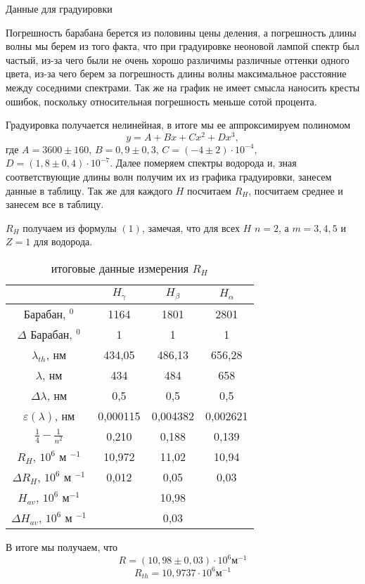 \documentclass[a4paper, 12pt]{article}%
\begin{document}
\begin{table}[h]
\begin{center}
\caption{Данные для градуировки}

\end{center}
\end{table}

Погрешность барабана берется из половины цены деления, а погрешность длины волны мы берем из того факта, что при градуировке неоновой лампой спектр был частый, из-за чего были не очень хорошо различимы различные оттенки одного цвета, из-за чего берем за погрешность длины волны максимальное расстояние между соседними спектрами. Так же на график не имеет смысла наносить кресты ошибок, поскольку относительная погрешность меньше сотой процента.


Градуировка получается нелинейная, в итоге мы ее аппроксимируем полиномом 
\[y = A + Bx + Cx^2 + Dx^3,\]
где $A = 3600\pm160$, $B = 0,9\pm0,3$, $C = (-4\pm2) \cdot 10^{-4}$, $D = (1,8 \pm 0,4) \cdot 10^{-7}$.
\newpage
Далее померяем спектры водорода и, зная соответствующие длины волн получим их из графика градуировки, занесем данные в таблицу. Так же для каждого $H$ посчитаем $R_H$, посчитаем среднее и занесем все в таблицу. 

$R_H$ получаем из формулы $(1)$, замечая, что для всех $H$ $n = 2$, а $m = 3, 4, 5$ и $Z=1$ для водорода.
\begin{table}[h]
\begin{center}
\begin{tabular}{|c|c|c|c|}
\hline
                            & $H_{\gamma}$ & $H_{\beta}$ & $H_{\alpha}$ \\ \hline
Барабан, $^0$               & 1164         & 1801        & 2801         \\ \hline
$\Delta$ Барабан, $^0$      & 1            & 1           & 1            \\ \hline
$\lambda_{th}$, нм          & 434,05       & 486,13      & 656,28       \\ \hline
$\lambda$, нм               & 434          & 484         & 658          \\ \hline
$\Delta\lambda$, нм         & 0,5          & 0,5         & 0,5          \\ \hline
$\varepsilon(\lambda)$, нм  & 0,000115     & 0,004382    & 0,002621     \\ \hline
$\frac{1}{4}-\frac{1}{n^2}$ & 0,210        & 0,188       & 0,139        \\ \hline
$R_H$, $10^6$ м    $^{-1}$         & 10,972       & 11,02       & 10,94        \\ \hline
$\Delta R_H$, $10^6$ м $^{-1}$     & 0,012        & 0,05        & 0,03         \\ \hline
$H_{av}$, $10^6$ м$^{-1}$          & \multicolumn{3}{c|}{10,98}                 \\ \hline
$\Delta H_{av}$, $10^6$ м $^{-1}$  & \multicolumn{3}{c|}{0,03}                  \\ \hline
\end{tabular}
\caption{итоговые данные измерения $R_H$}
\end{center}
\end{table}
\newpage
В итоге мы получаем, что 
\[R = (10,98 \pm 0,03) \cdot 10^6 \text{м}^{-1}\]
\[R_{th} = 10,9737 \cdot 10^6 \text{м}^{-1}\]
\end{document}
